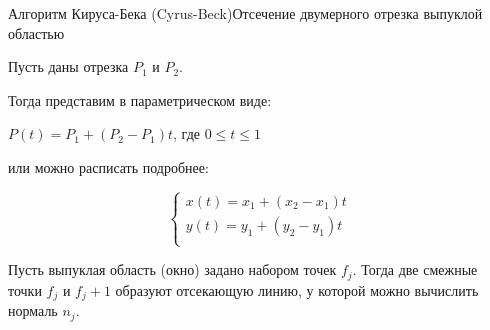 \documentclass{beamer}
\begin{document}
	\begin{frame}{Алгоритм Кируса-Бека (Cyrus-Beck)}{Отсечение двумерного отрезка выпуклой областью}


		Пусть даны отрезка $P_1$ и $P_2$. 

		Тогда представим в параметрическом виде:

		$P(t) = P_1 + (P_2 - P_1)t$, где $0 \leqslant  t \leqslant 1$

		или можно расписать подробнее:

		\[
		\begin{cases}
			x(t) = x_1 + (x_2 - x_1) t\\
			y(t) = y_1 + (y_2 - y_1) t\\
		\end{cases}	
		\]

		Пусть выпуклая область (окно) задано набором точек $f_j$. Тогда две смежные точки $f_j$ и $f_j+1$ образуют отсекающую линию, у которой можно вычислить нормаль $n_j$.

	\end{frame}
\end{document}
